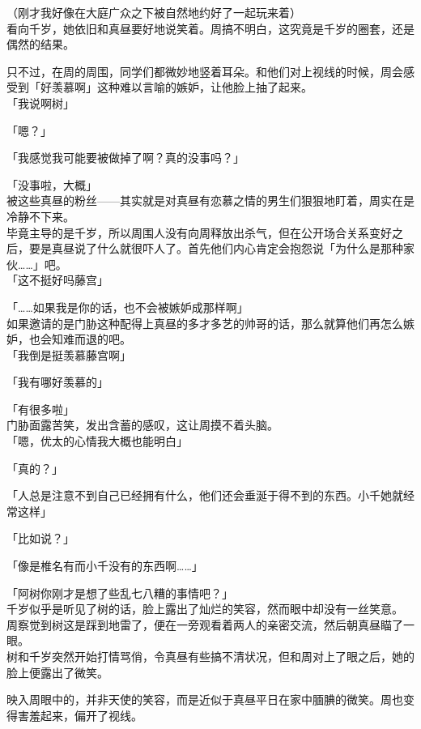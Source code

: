 （刚才我好像在大庭广众之下被自然地约好了一起玩来着）\\

看向千岁，她依旧和真昼要好地说笑着。周搞不明白，这究竟是千岁的圈套，还是偶然的结果。

只不过，在周的周围，同学们都微妙地竖着耳朵。和他们对上视线的时候，周会感受到「好羡慕啊」这种难以言喻的嫉妒，让他脸上抽了起来。\\

「我说啊树」

「嗯？」

「我感觉我可能要被做掉了啊？真的没事吗？」

「没事啦，大概」\\

被这些真昼的粉丝——其实就是对真昼有恋慕之情的男生们狠狠地盯着，周实在是冷静不下来。\\

毕竟主导的是千岁，所以周围人没有向周释放出杀气，但在公开场合关系变好之后，要是真昼说了什么就很吓人了。首先他们内心肯定会抱怨说「为什么是那种家伙……」吧。\\

「这不挺好吗藤宫」

「……如果我是你的话，也不会被嫉妒成那样啊」\\

如果邀请的是门胁这种配得上真昼的多才多艺的帅哥的话，那么就算他们再怎么嫉妒，也会知难而退的吧。\\

「我倒是挺羡慕藤宫啊」

「我有哪好羡慕的」

「有很多啦」\\

门胁面露苦笑，发出含蓄的感叹，这让周摸不着头脑。\\

「嗯，优太的心情我大概也能明白」

「真的？」

「人总是注意不到自己已经拥有什么，他们还会垂涎于得不到的东西。小千她就经常这样」

「比如说？」

「像是椎名有而小千没有的东西啊……」

「阿树你刚才是想了些乱七八糟的事情吧？」\\

千岁似乎是听见了树的话，脸上露出了灿烂的笑容，然而眼中却没有一丝笑意。\\

周察觉到树这是踩到地雷了，便在一旁观看着两人的亲密交流，然后朝真昼瞄了一眼。\\

树和千岁突然开始打情骂俏，令真昼有些搞不清状况，但和周对上了眼之后，她的脸上便露出了微笑。

映入周眼中的，并非天使的笑容，而是近似于真昼平日在家中腼腆的微笑。周也变得害羞起来，偏开了视线。
